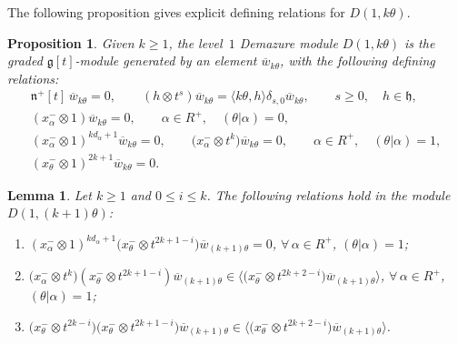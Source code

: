 \documentclass[10pt,a4paper]{amsart}
\newtheorem{lemma}{Lemma}
\newtheorem{proposition}{Proposition}
\begin{document}
The following proposition gives explicit def\/ining relations for $D(1,k\theta)$.
\begin{proposition}
\label{WvsD}
Given $k\geq 1$, the level~$1$ Demazure module $D(1,k\theta)$ is the graded $\mathfrak{g}[t]$-module generated by an
element $\overline{w}_{k\theta}$, with the following defining relations:
\begin{gather*}
\mathfrak{n}^{+}[t]\, \overline{w}_{k\theta}=0,
\qquad
(h \otimes t^s) \overline{w}_{k\theta} = \langle k\theta, h\rangle \delta_{s,0} \overline{w}_{k\theta},
\qquad
s\geq0,
\quad
h\in\mathfrak{h},
\\
(x^{-}_{\alpha}\otimes 1) \overline{w}_{k\theta}=0,
\qquad
\alpha\in R^+,
\quad
(\theta|\alpha)=0,
\\
(x^{-}_{\alpha} \otimes 1)^{kd_{\alpha}+1} \overline{w}_{k\theta}=0,
\qquad
\big(x^{-}_{\alpha} \otimes t^k\big) \overline{w}_{k\theta}=0,
\qquad
\alpha\in R^+,
\quad
(\theta|\alpha)=1,
\\
(x^{-}_{\theta} \otimes 1)^{2k+1} \overline{w}_{k\theta}=0.
\end{gather*}
\end{proposition}

\begin{lemma}
\label{crucial}
Let $k\geq 1$ and $0\leq i \leq k$. The following relations hold in the module $D(1,(k+1)\theta)$:
\begin{enumerate}\itemsep=0pt
\item[$1)$] $(x^{-}_{\alpha} \otimes 1)^{kd_{\alpha}+1}\big(x^{-}_{\theta} \otimes t^{2k+1-i}\big) \overline{w}_{(k+1)\theta}=0$,
$\forall\, \alpha \in R^{+}$, $(\theta|\alpha)=1$;
\item[$2)$] $\big(x^{-}_{\alpha} \otimes t^{k}\big) (x^{-}_{\theta} \otimes t^{2k+1-i}) \overline{w}_{(k+1)\theta} \in
\big\langle \big(x^{-}_{\theta} \otimes t^{2k+2-i}\big) \overline{w}_{(k+1)\theta} \big\rangle$,
$\forall\, \alpha \in R^{+}$, $(\theta|\alpha)=1$;
\item[$3)$] $\big(x^{-}_{\theta} \otimes t^{2k-i}\big) \big(x^{-}_{\theta} \otimes t^{2k+1-i}\big) \overline{w}_{(k+1)\theta}
\in
\big\langle \big(x^{-}_{\theta} \otimes t^{2k+2-i}\big) \overline{w}_{(k+1)\theta} \big\rangle$.
\end{enumerate}
\end{lemma}
\end{document}
